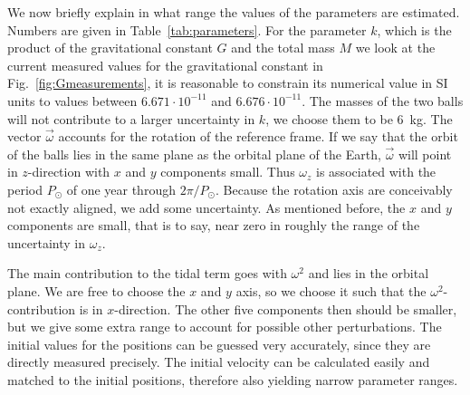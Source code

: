 \documentclass[prb,preprint]{revtex4-1}
\begin{document}
We now briefly explain in what range the values of the parameters are
estimated.  Numbers are given in Table~\ref{tab:parameters}.  For the
parameter $k$, which is the product of the gravitational constant $G$
and the total mass $M$ we look at the current measured values for the
gravitational constant in Fig.~\ref{fig:Gmeasurements}, it is
reasonable to constrain its numerical value in SI units to values
between $6.671 \cdot 10^{-11}$ and $6.676 \cdot 10^{-11}$. The masses
of the two balls will not contribute to a larger uncertainty in $k$,
we choose them to be 6~kg.  The vector $\vec{\omega}$ accounts for the
rotation of the reference frame. If we say that the orbit of the balls
lies in the same plane as the orbital plane of the Earth,
$\vec{\omega}$ will point in $z$-direction with $x$ and $y$
components small. Thus $\omega_z$ is associated with the period
$P_\odot$ of one year through $2\pi/P_\odot$. Because the rotation
axis are conceivably not exactly aligned, we add some uncertainty. As
mentioned before, the $x$ and $y$ components are small, that is to
say, near zero in roughly the range of the uncertainty in
$\omega_z$.


The main contribution to the tidal term goes with $\omega^2$ and lies in the orbital plane. We are free to choose the $x$ and $y$ axis, so we choose it such that the $\omega^2$-contribution is in $x$-direction. The other five components then should be smaller, but we give some extra range to account for possible other perturbations.
The initial values for the positions can be guessed very accurately, since they are directly measured precisely. The initial velocity can be calculated easily and matched to the initial positions, therefore also yielding narrow parameter ranges.
\end{document}
